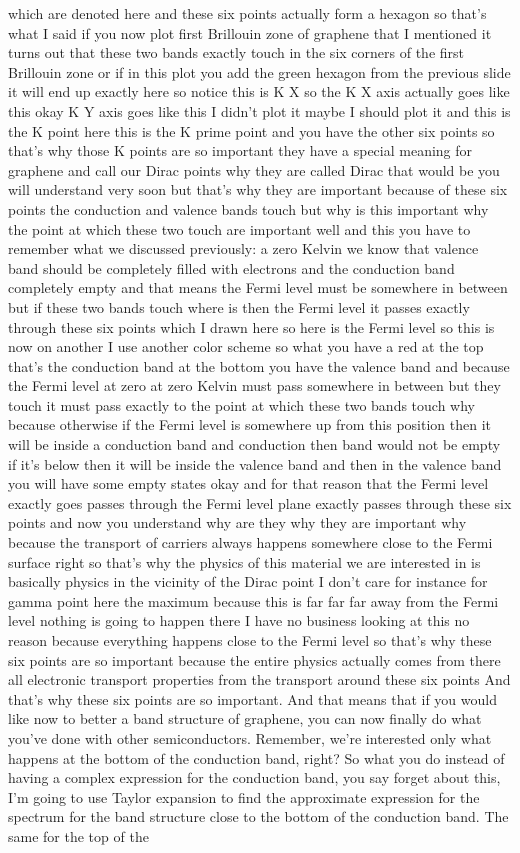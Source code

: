 which are denoted here and these six points actually form a hexagon so that's what I said if you now plot first Brillouin zone of graphene that I mentioned it turns out that these two bands exactly touch in the six corners of the first Brillouin zone or if in this plot you add the green hexagon from the previous slide it will end up exactly here so notice this is K X so the K X axis actually goes like this okay K Y axis goes like this I didn't plot it maybe I should plot it and this is the K point here this is the K prime point and you have the other six points so that's why those K points are so important they have a special meaning for graphene and call our Dirac points why they are called Dirac that would be you will understand very soon but that's why they are important because of these six points the conduction and valence bands touch but why is this important why the point at which these two touch are important well and this you have to remember what we discussed previously: a zero Kelvin we know that valence band should be completely filled with electrons and the conduction band completely empty and that means the Fermi level must be somewhere in between but if these two bands touch where is then the Fermi level it passes exactly through these six points which I drawn here so here is the Fermi level so this is now on another I use another color scheme so what you have a red at the top that's the conduction band at the bottom you have the valence band and because the Fermi level at zero at zero Kelvin must pass somewhere in between but they touch it must pass exactly to the point at which these two bands touch why because otherwise if the Fermi level is somewhere up from this position then it will be inside a conduction band and conduction then band would not be empty if it's below then it will be inside the valence band and then in the valence band you will have some empty states okay and for that reason that the Fermi level exactly goes passes through the Fermi level plane exactly passes through these six points and now you understand why are they why they are important why because the transport of carriers always happens somewhere close to the Fermi surface right so that's why the physics of this material we are interested in is basically physics in the vicinity of the Dirac point I don't care for instance for gamma point here the maximum because this is far far far away from the Fermi level nothing is going to happen there I have no business looking at this no reason because everything happens close to the Fermi level so that's why these six points are so important because the entire physics actually comes from there all electronic transport properties from the transport around these six points And that's why these six points are so important. And that means that if you would like now to better a band structure of graphene, you can now finally do what you've done with other semiconductors. Remember, we're interested only what happens at the bottom of the conduction band, right? So what you do instead of having a complex expression for the conduction band, you say forget about this, I'm going to use Taylor expansion to find the approximate expression for the spectrum for the band structure close to the bottom of the conduction band. The same for the top of the 